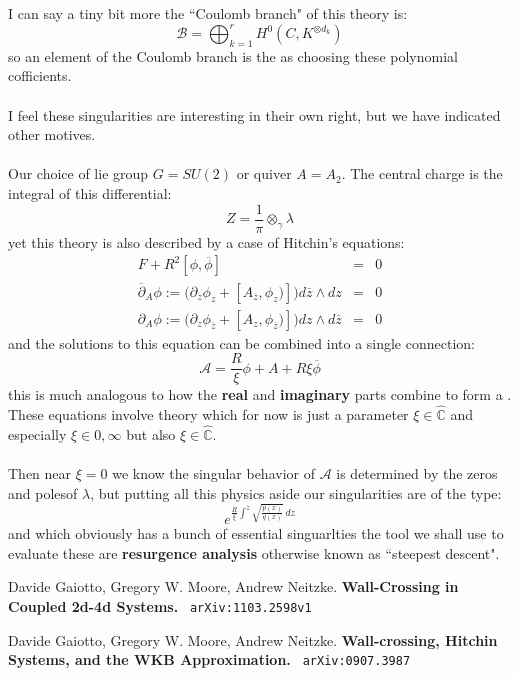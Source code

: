 \documentclass[12pt]{article}
\begin{document}
\noindent I can say a tiny bit more the ``Coulomb branch" of this theory is:
$$ \mathcal{B} = \bigoplus_{k=1}^r H^0(C, K^{\otimes d_k}) $$
so an element of the Coulomb branch is the as choosing these polynomial cofficients.  \\ \\
I feel these singularities are interesting in their own right, but we have indicated other motives.  \\ \\
Our choice of lie group $G = SU(2)$ or quiver $A = A_2$.  The central charge is the integral of this differential:
$$ Z = \frac{1}{\pi} \otimes_\gamma \lambda $$
yet this theory is also described by a case of Hitchin's equations:
\begin{eqnarray}
F + R^2 [ \phi, \overline{\phi}] &=& 0 \\
\overline{\partial}_A \phi := \big( \partial_{\overline{z}} \phi_z + [A_{\overline{z}}, \phi_z)] \big) d\overline{z} \wedge dz &=& 0 \\
\partial_A \phi := \big( \partial_z \phi_{\overline{z}} + [A_z, \phi_{\overline{z}})] \big) dz \wedge d\overline{z}&=& 0 
\end{eqnarray}
and the solutions to this equation can be combined into a single connection:
$$ \mathcal{A} = \frac{R}{\xi} \phi + A + R \xi \overline{\phi} $$
this is much analogous to how the \textbf{real} and \textbf{imaginary} parts combine to form a \textbf{\color{blue!50!white}{complex number}}.  These equations involve {\color{red!50!white}{twistor}} theory which for now is just a parameter $\xi \in \hat{\mathbb{C}}$ and especially $\xi \in {0, \infty}$ but also $\xi \in \hat{\mathbb{C}}$. \\ \\
Then near $\xi = 0$ we know the singular behavior of $\mathcal{A}$ is determined by the zeros and polesof $\lambda$, but putting all this physics aside our singularities are of the type:
$$ e^{ \frac{R}{\xi} \int^z \sqrt{\frac{p(x)}{q(x)}} \, dz} $$
and which obviously has a bunch of essential singuarlties the tool we shall use to evaluate these are \textbf{resurgence analysis} otherwise known as ``steepest descent".
\newpage

\selectfont \fontsize{12}{10}\selectfont

\begin{thebibliography}{}

\item Davide Gaiotto, Gregory W. Moore, Andrew Neitzke. \textbf{Wall-Crossing in Coupled 2d-4d Systems.} \texttt{ arXiv:1103.2598v1}


\item Davide Gaiotto, Gregory W. Moore, Andrew Neitzke. \textbf{Wall-crossing, Hitchin Systems, and the WKB Approximation.} \texttt{ arXiv:0907.3987}


\end{thebibliography}
\end{document}
